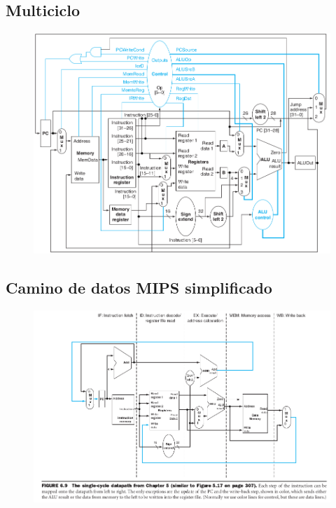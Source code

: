 \documentclass{article}
\begin{document}
\subsection{Multiciclo}
\begin{figure}[h!]
    \includegraphics[width=\linewidth]{imagenes/pipeline/multiciclo.png}
\end{figure}

\subsection{Camino de datos MIPS simplificado}

\begin{figure}[h!]
    \includegraphics[width=\linewidth]{imagenes/pipeline/simple-datapath.png}
\end{figure}
\end{document}
